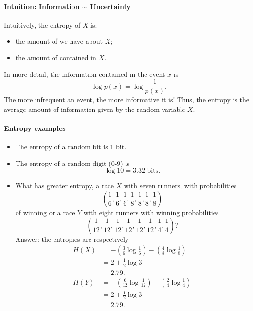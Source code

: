 \documentclass[a4paper, 11pt, openany]{book}
\begin{document}
\paragraph{Intuition: Information $\sim$ Uncertainty}

Intuitively, the entropy of $X$ is:
\begin{itemize}
	\item the amount of  we have about $X$;

	\item the amount of  contained in $X$.
\end{itemize}
In more detail, the information contained in the event $x$ is
\[
	-\log p(x) = \log \frac{1}{p(x)}.
\]
The more infrequent an event, the more informative it is! Thus, the entropy is the average amount of information given by the random variable $X$.





\paragraph{Entropy examples}
\begin{itemize}
\item The entropy of a random bit is 1 bit.

\item The entropy of a random digit (0-9) is
\[
    \log 10 = 3.32 \text{ bits.}
\]

\item What has greater entropy, a race $X$ with seven runners, with probabilities
\[
    \left( \frac{1}{6}, \frac{1}{6}, \frac{1}{6}, \frac{1}{8}, \frac{1}{8}, \frac{1}{8}, \frac{1}{8} \right)
\]
 of winning or a race $Y$ with eight runners with winning probabilities
\[
    \left( \frac{1}{12}, \frac{1}{12}, \frac{1}{12}, \frac{1}{12}, \frac{1}{12}, \frac{1}{12}, \frac{1}{4}, \frac{1}{4} \right)?
\]
Answer: the entropies are respectively
\begin{align*}
    H(X) &= - \left( \frac{3}{6} \log \frac{1}{6} \right) - \left( \frac{4}{8} \log \frac{1}{8} \right) \\
    &= 2 + \frac{1}{2} \log 3 \\
    & = 2.79.\\
    H(Y) &= - \left( \frac{6}{12} \log \frac{1}{12} \right) - \left( \frac{2}{4} \log \frac{1}{4} \right) \\
    &= 2 + \frac{1}{2} \log 3\\
    &= 2.79.
\end{align*}
\end{itemize}
\end{document}
